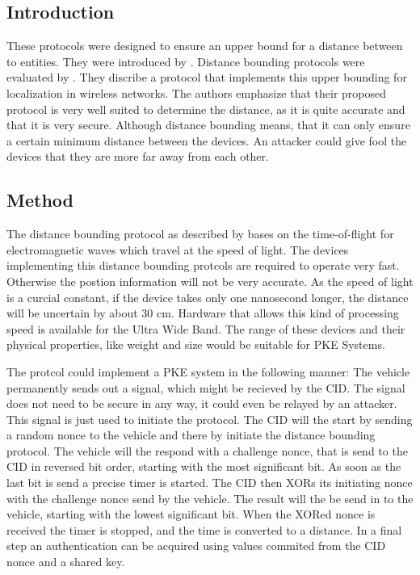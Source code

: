 
\subsection{Introduction}
	These protocols were designed to ensure an upper bound for a distance between to entities.
	They were introduced by \citeauthor{distanceBoundingProtocols}.
	Distance bounding protocols were evaluated by \citeauthor{secPos}.
	They discribe a protocol that implements this upper bounding for localization in wireless networks.
	The authors emphasize that their proposed protocol is very well suited to determine the distance,
	as it is quite accurate and that it is very secure.
	Although distance bounding means,
	that it can only ensure a certain minimum distance between the devices.
	An attacker could give fool the devices that they are more far away from each other.
	
\subsection{Method}
	The distance bounding protocol as described by \citeauthor{secPos}
	bases on the time-of-flight for electromagnetic waves which travel at the speed of light.
	The devices implementing this distance bounding protcols are required to operate very fast.
	Otherwise the postion information will not be very accurate.
	As the speed of light is a curcial constant,
	if the device takes only one nanosecond longer,
	the distance will be uncertain by about 30 cm.
	Hardware that allows this kind of processing speed is available for the Ultra Wide Band.
	The range of these devices and their physical properties,
	like weight and size would be suitable for PKE Systems.

	The protcol could implement a PKE system in the following manner:
	The vehicle permanently sends out a signal,
	which might be recieved by the CID.
	The signal does not need to be secure in any way,
	it could even be relayed by an attacker.
	This signal is just used to initiate the protocol.
	The CID will the start by sending a random nonce to the vehicle
	and there by initiate the distance bounding protocol.
	The vehicle will the respond with a challenge nonce,
	that is send to the CID in reversed bit order,
	starting with the most significant bit.
	As soon as the last bit is send a precise timer is started.
	The CID then XORs its initiating nonce with the challenge nonce send by the vehicle.
	The result will the be send in to the vehicle,
	starting with the lowest significant bit.
	When the XORed nonce is received the timer is stopped,
	and the time is converted to a distance.
	In a final step an authentication can be acquired using values commited from the CID nonce
	and a shared key.

